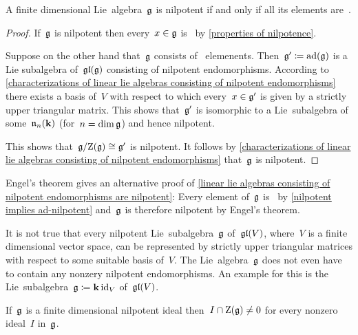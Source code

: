 \begin{theorem}[Engel]
  A finite dimensional Lie~algebra~$\mathfrak{g}$ is nilpotent if and only if all its elements are~{\adnilpotent}.
\end{theorem}


\begin{proof}
  If~$\mathfrak{g}$ is nilpotent then every~$x \in \mathfrak{g}$ is~{\adnilpotent} by \cref{properties of nilpotence}.
 
  Suppose on the other hand that~$\mathfrak{g}$ consists of~{\adnilpotent} elemenents.
  Then~$\mathfrak{g}' \coloneqq \operatorname{ad}(\mathfrak{g})$ is a Lie subalgebra of~$\mathfrak{gl}(\mathfrak{g})$ consisting of nilpotent endomorphisms.
  According to \cref{characterizations of linear lie algebras consisting of nilpotent endomorphisms} there exists a basis of~$V$ with respect to which every~$x \in \mathfrak{g}'$ is given by a strictly upper triangular matrix.
  This shows that~$\mathfrak{g}'$ is isomorphic to a Lie~subalgebra of some~$\mathfrak{n}_n(\mathbf{k})$ (for~$n = \dim \mathfrak{g}$) and hence nilpotent.
  
  This shows that~$\mathfrak{g}/{\operatorname{Z}(\mathfrak{g})} \cong \mathfrak{g}'$ is nilpotent.
  It follows by \cref{characterizations of linear lie algebras consisting of nilpotent endomorphisms} that~$\mathfrak{g}$ is nilpotent.
\end{proof}


\begin{remark}
  Engel’s theorem gives an alternative proof of \cref{linear lie algebras consisting of nilpotent endomorphisms are nilpotent}:
  Every element of~$\mathfrak{g}$ is~{\adnilpotent} by \cref{nilpotent implies ad-nilpotent} and~$\mathfrak{g}$ is therefore nilpotent by Engel’s theorem.
\end{remark}


\begin{remark}
  It is not true that every nilpotent Lie~subalgebra~$\mathfrak{g}$ of~$\mathfrak{gl}(V)$, where~$V$ is a finite dimensional vector space, can be represented by strictly upper triangular matrices with respect to some suitable basis of~$V$.
  The Lie~algebra~$\mathfrak{g}$ does not even have to contain any nonzery nilpotent endomorphisms.
  An example for this is the {\onedimensional} Lie~subalgebra~$\mathfrak{g} \coloneqq \mathbf{k} \, {\operatorname{id}_V}$ of~$\mathfrak{gl}(V)$.
\end{remark}


\begin{corollary}
  \label{ideals in nilpotent does intersection center}
  If~$\mathfrak{g}$ is a finite dimensional nilpotent ideal then~$I \cap \operatorname{Z}(\mathfrak{g}) \neq 0$ for every nonzero ideal~$I$ in~$\mathfrak{g}$.
\end{corollary}



